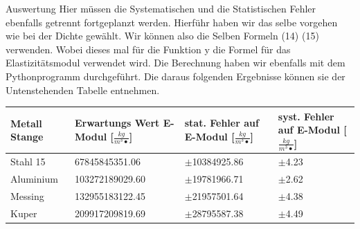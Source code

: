 \documentclass[twoside]{protokoll}
\begin{document}
\begin{aufgabe}{Auswertung}
Hier müssen die Systematischen und die Statistischen Fehler ebenfalls getrennt fortgeplanzt werden. Hierführ haben wir das selbe vorgehen wie bei der Dichte gewählt. Wir können also die Selben Formeln (14) (15) verwenden. Wobei dieses mal für die Funktion y die Formel für das Elastizitätsmodul verwendet wird. Die Berechnung haben wir ebenfalls mit dem Pythonprogramm durchgeführt. Die daraus folgenden Ergebnisse können sie der Untenstehenden Tabelle entnehmen. 

 \begin{table}[H]
        \centering
        \begin{tabularx}{1\textwidth}{X X X X} %
            \toprule
            \textbf{Metall Stange} & \textbf{Erwartungs Wert E-Modul [$\frac{kg}{m^3•}$]} & \textbf{stat. Fehler auf E-Modul [$\frac{kg}{m^3•}$]} & \textbf{syst. Fehler auf E-Modul [$\frac{kg}{m^3•}$]}\\
            \midrule
            Stahl 15 & 67845845351.06 & $\pm$10384925.86 & $\pm$4.23 \\
            Aluminium & 103272189029.60 & $\pm$19781966.71 & $\pm$2.62 \\
            Messing & 132955183122.45 & $\pm$21957501.64 & $\pm$4.38 \\
            Kuper & 209917209819.69 & $\pm$28795587.38 & $\pm$4.49\\
            \bottomrule
        \end{tabularx}
        \label{tab:mytable}
    \end{table}


\end{aufgabe}

\end{document}
